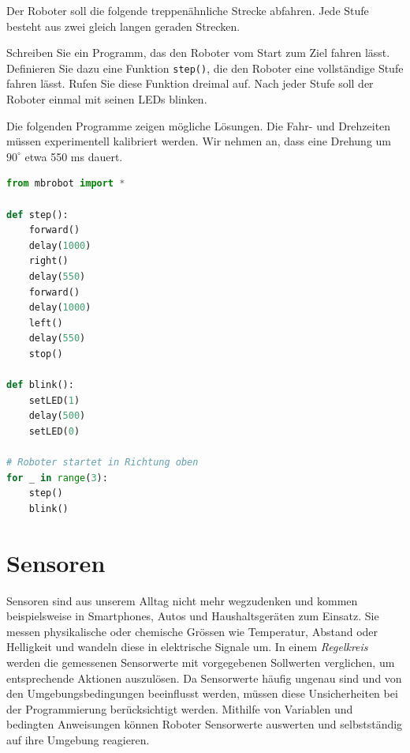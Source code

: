 \begin{myexercise}


    Der Roboter soll die folgende treppenähnliche Strecke
    abfahren. Jede Stufe besteht aus zwei gleich langen
    geraden Strecken.

    \begin{center}
    \end{center}

    Schreiben Sie ein Programm, das den Roboter
    vom Start zum Ziel fahren lässt.
    Definieren Sie dazu eine Funktion
    \texttt{step()}, die den Roboter eine
    vollständige Stufe fahren lässt.
    Rufen Sie diese Funktion dreimal auf.
    Nach jeder Stufe soll der Roboter einmal
    mit seinen LEDs blinken.


    \begin{myanswer}
        Die folgenden Programme zeigen mögliche Lösungen.
        Die Fahr- und Drehzeiten müssen experimentell
        kalibriert werden. Wir nehmen an, dass eine
        Drehung um \(90^\circ\) etwa 550 ms dauert.


        \begin{lstlisting}[language=Python]
from mbrobot import *

def step():
    forward()
    delay(1000)
    right()
    delay(550)
    forward()
    delay(1000)
    left()
    delay(550)
    stop()

def blink():
    setLED(1)
    delay(500)
    setLED(0)

# Roboter startet in Richtung oben
for _ in range(3):
    step()
    blink()
        \end{lstlisting}
    \end{myanswer}
\end{myexercise}


\section{Sensoren}

Sensoren sind aus unserem Alltag nicht mehr wegzudenken und kommen
beispielsweise in Smartphones, Autos und Haushaltsgeräten zum Einsatz.
Sie messen physikalische oder chemische Grössen wie Temperatur,
Abstand oder Helligkeit und wandeln diese in elektrische Signale um.
In einem \emph{Regelkreis} werden die gemessenen Sensorwerte mit
vorgegebenen Sollwerten verglichen, um entsprechende Aktionen auszulösen.
Da Sensorwerte häufig ungenau sind und von den Umgebungsbedingungen
beeinflusst werden, müssen diese Unsicherheiten bei der Programmierung
berücksichtigt werden.
Mithilfe von Variablen und bedingten Anweisungen können Roboter
Sensorwerte auswerten und selbstständig auf ihre Umgebung reagieren.


